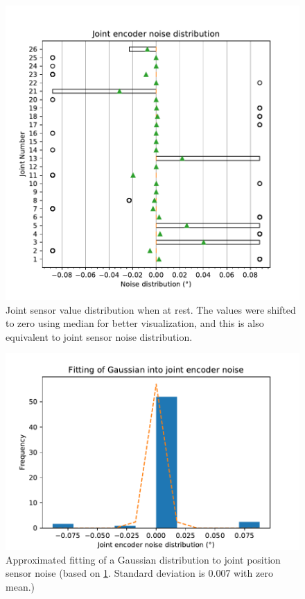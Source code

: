 \documentclass[english, printversion, nomenclature, notitle]{tuvisionthesis} %
\begin{document}
\begin{center}
	\begin{figure}
		\centering
		\includegraphics[width=0.9\columnwidth]{figures/joint_noise.pdf}
		\caption[Joint sensor angle value distribution when at rest.]{Joint sensor value distribution when at rest. The values were shifted to zero using median for better visualization, and this is also equivalent to joint sensor noise distribution.}
		\label{fig:joint_sensor_noise}
	\end{figure}
\end{center}

\begin{center}
	\begin{figure}
		\centering
		\includegraphics[width=0.9\columnwidth]{figures/joint_noise_gaussian.pdf}
%		
		\caption{Approximated fitting of a Gaussian distribution to joint position sensor noise (based on \cref{fig:joint_sensor_noise}. Standard deviation is 0.007 with zero mean.)}
		\label{fig:joint_sensor_noise_gauss}
	\end{figure}
\end{center}
\end{document}
